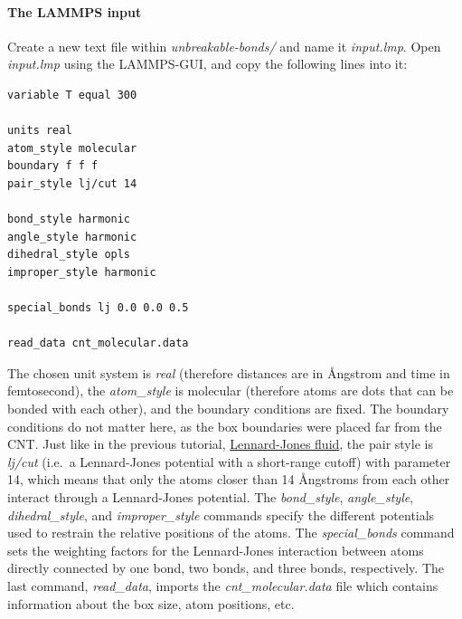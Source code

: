 \documentclass[9pt,tutorial]{livecoms}
\begin{document}
\paragraph{The LAMMPS input}
Create a new text file within \textit{unbreakable-bonds/} and name
it \textit{input.lmp}. Open \textit{input.lmp} using the LAMMPS-GUI, and copy
the following lines into it:
{\normalsize \begin{verbatim}
variable T equal 300

units real
atom_style molecular
boundary f f f
pair_style lj/cut 14

bond_style harmonic
angle_style harmonic
dihedral_style opls
improper_style harmonic

special_bonds lj 0.0 0.0 0.5

read_data cnt_molecular.data
\end{verbatim}}
The chosen unit system is \textit{real} (therefore distances are in Ångstrom
and time in femtosecond), the \textit{atom\_style} is molecular (therefore
atoms are dots that can be bonded with each other), and the boundary conditions
are fixed. The boundary conditions do not matter here, as the box boundaries
were placed far from the CNT. Just like in the previous tutorial,
\hyperref[lennard-jones-label]{Lennard-Jones fluid}, the pair style
is \textit{lj/cut} (i.e.~a Lennard-Jones potential with a short-range cutoff)
with parameter 14, which means that only the atoms closer than 14 Ångstroms
from each other interact through a Lennard-Jones potential.
The \textit{bond\_style}, \textit{angle\_style}, \textit{dihedral\_style},
and \textit{improper\_style} commands specify the different potentials used
to restrain the relative positions of the atoms. The \textit{special\_bonds}
command sets the weighting factors for the Lennard-Jones interaction between
atoms directly connected by one bond, two bonds, and three bonds, respectively.
The last command, \textit{read\_data}, imports the
\textit{cnt\_molecular.data} file which contains information about the box
size, atom positions, etc.
\end{document}
